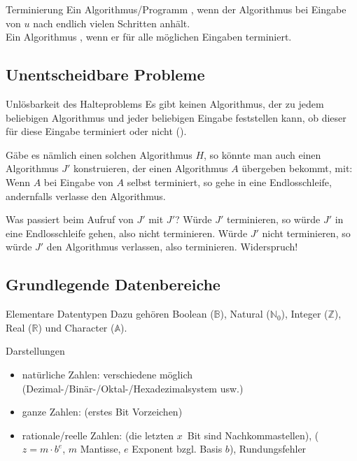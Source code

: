 \begin{Def}{Terminierung}
    Ein Algorithmus/Programm ,
    wenn der Algorithmus bei Eingabe von $u$ nach endlich vielen Schritten
    anhält. \\
    Ein Algorithmus , wenn er für alle möglichen
    Eingaben terminiert.
\end{Def}

\subsection{%
    Unentscheidbare Probleme%
}

\begin{Satz}{Unlösbarkeit des Halteproblems}
    Es gibt keinen Algorithmus, der zu jedem beliebigen Algorithmus und jeder
    beliebigen Eingabe feststellen kann, ob dieser für diese Eingabe terminiert
    oder nicht ().

    Gäbe es nämlich einen solchen Algorithmus $H$, so könnte man auch einen
    Algorithmus $J'$ konstruieren, der einen Algorithmus $A$ übergeben bekommt,
    mit:
    Wenn $A$ bei Eingabe von $A$ selbst terminiert, so gehe in eine
    Endlosschleife, andernfalls verlasse den Algorithmus.

    Was passiert beim Aufruf von $J'$ mit $J'$? Würde $J'$ terminieren, so
    würde $J'$ in eine Endlosschleife gehen, also nicht terminieren.
    Würde $J'$  nicht terminieren, so würde $J'$ den Algorithmus verlassen,
    also terminieren.
    Widerspruch!
\end{Satz}

\subsection{%
    Grundlegende Datenbereiche%
}

\begin{Def}{Elementare Datentypen}
    Dazu gehören Boolean ($\mathbb{B}$), Natural ($\mathbb{N}_0$),
    Integer ($\mathbb{Z}$), Real ($\mathbb{R}$) und Character ($\mathbb{A}$).
\end{Def}

\begin{Def}{Darstellungen}
    \begin{itemize}
        \item natürliche Zahlen: verschiedene 
        möglich \\
        (Dezimal-/Binär-/Oktal-/Hexadezimalsystem usw.)

        \item ganze Zahlen: 
        (erstes Bit Vorzeichen)

        \item rationale/reelle Zahlen: 
        (die letzten $x$~Bit sind Nachkommastellen),
        ($z = m \cdot b^e$, $m$ Mantisse, $e$ Exponent bzgl. Basis $b$),
        Rundungsfehler
    \end{itemize}
\end{Def}

